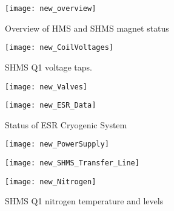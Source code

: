 {%

\begin{figure}
\begin{center}
\texttt{[image: new\_overview]}
\caption{\label{fig:magc_overview}Overview of HMS and SHMS magnet status}
\end{center}
\end{figure}

\begin{figure}
\begin{center}
\texttt{[image: new\_CoilVoltages]}
\caption{\label{fig:magc_coilvoltages}SHMS Q1 voltage taps.}
\end{center}
\end{figure}


\begin{figure}
\begin{center}
\texttt{[image: new\_Valves]}
\caption{\label{fig:magc_valves}}
\end{center}
\end{figure}


\begin{figure}
\begin{center}
\texttt{[image: new\_ESR\_Data]}
\caption{\label{fig:magc_ESR_Data}Status of ESR Cryogenic System}
\end{center}
\end{figure}


\begin{figure}
\begin{center}
\texttt{[image: new\_PowerSupply]}
\caption{\label{fig:magc_PowerSupply}}
\end{center}
\end{figure}


\begin{figure}
\begin{center}
\texttt{[image: new\_SHMS\_Transfer\_Line]}
\caption{\label{fig:magc_SHMS_Transfer_Line}}
\end{center}
\end{figure}


\begin{figure}
\begin{center}
\texttt{[image: new\_Nitrogen]}
\caption{\label{fig:magc_Nitrogen}SHMS Q1 nitrogen temperature and levels}
\end{center}
\end{figure}


}
